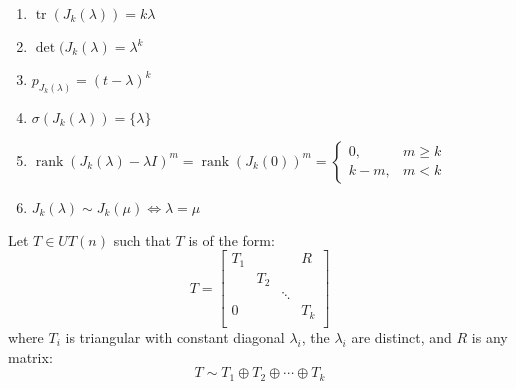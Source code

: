\documentclass[letterpaper,12pt,fleqn]{article}
\DeclareMathOperator{\tr}{tr}
\DeclareMathOperator{\rnk}{rank}
\renewcommand{\l}{\lambda}
\newcommand{\m}{\mu}
\renewcommand{\o}{\sigma}
\begin{document}
\begin{properties}[$J_k(\l)$]
  \listbreak
  \begin{enumerate}
  \item $\tr(J_k(\l))=k\l$
  \item $\det(J_k(\l)=\l^k$
  \item $p_{J_k(\l)}=(t-\l)^k$
  \item $\o(J_k(\l))=\{\l\}$
  \item $\rnk(J_k(\l)-\l I)^m=\rnk(J_k(0))^m=\begin{cases}
    0, & m\ge k \\
    k-m, & m<k
  \end{cases}$
  \item $J_k(\l)\sim J_k(\m)\iff\l=\m$
  \end{enumerate}
\end{properties}

\begin{lemma}
  Let $T\in UT(n)$ such that $T$ is of the form:
  \[T=\begin{bmatrix}
  T_1 & & & R \\
  & T_2 & & \\
  & & \ddots & \\
  0 & & & T_k \\
  \end{bmatrix}\]
  where $T_i$ is triangular with constant diagonal $\l_i$, the $\l_i$ are distinct, and
  $R$ is any matrix:
  \[T\sim T_1\oplus T_2\oplus\cdots\oplus T_k\]
\end{lemma}
\end{document}
